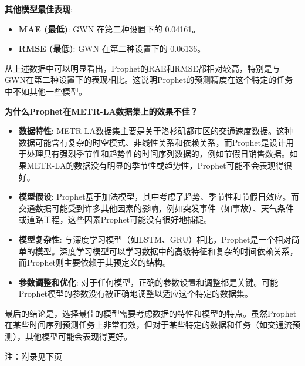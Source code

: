 \documentclass[4pt]{article}
\begin{document}
\textbf{其他模型最佳表现}:
\begin{itemize}
    \item \textbf{MAE (最低)}: GWN 在第二种设置下的 0.04161。
    \item \textbf{RMSE (最低)}: GWN 在第二种设置下的 0.06136。
\end{itemize}

从上述数据中可以明显看出，Prophet的RAE和RMSE都相对较高，特别是与GWN在第二种设置下的表现相比。这说明Prophet的预测精度在这个特定的任务中不如其他一些模型。

\textbf{为什么Prophet在METR-LA数据集上的效果不佳？}

\begin{itemize}
    \item \textbf{数据特性}: METR-LA数据集主要是关于洛杉矶都市区的交通速度数据。这种数据可能含有复杂的时空模式、非线性关系和依赖关系，而Prophet是设计用于处理具有强烈季节性和趋势性的时间序列数据的，例如节假日销售数据。如果METR-LA的数据没有明显的季节性或趋势性，Prophet可能不会表现得很好。
    
    \item \textbf{模型假设}: Prophet基于加法模型，其中考虑了趋势、季节性和节假日效应。而交通数据可能受到许多其他因素的影响，例如突发事件（如事故）、天气条件或道路工程，这些因素Prophet可能没有很好地捕捉。
    
    \item \textbf{模型复杂性}: 与深度学习模型（如LSTM、GRU）相比，Prophet是一个相对简单的模型。深度学习模型可以学习数据中的高级特征和复杂的时间依赖关系，而Prophet则主要依赖于其预定义的结构。
    
    \item \textbf{参数调整和优化}: 对于任何模型，正确的参数设置和调整都是关键。可能Prophet模型的参数没有被正确地调整以适应这个特定的数据集。
\end{itemize}

最后的结论是，选择最佳的模型需要考虑数据的特性和模型的特点。虽然Prophet在某些时间序列预测任务上非常有效，但对于某些特定的数据和任务（如交通流预测），其他模型可能会表现得更好。

注：附录见下页
\newpage
\appendix
\end{document}
